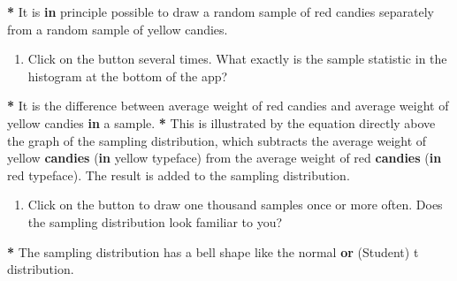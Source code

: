 \documentclass[a4paper]{book}
\newenvironment{Shaded}{\begin{snugshade}}{\end{snugshade}}
\newcommand{\KeywordTok}[1]{\textcolor[rgb]{0,0,0}{\textbf{#1}}}
\newcommand{\StringTok}[1]{\textcolor[rgb]{0.00,0.00,0.00}{#1}}
\newcommand{\ControlFlowTok}[1]{\textcolor[rgb]{0.00,0.00,0.00}{\textbf{#1}}}
\newcommand{\OperatorTok}[1]{\textcolor[rgb]{0.00,0.00,0.00}{\textbf{#1}}}
\newcommand{\NormalTok}[1]{#1}
\providecommand{\tightlist}{%
  \setlength{\itemsep}{0pt}\setlength{\parskip}{0pt}}
\theoremstyle{definition}
\theoremstyle{definition}
\theoremstyle{definition}
\theoremstyle{remark}
\begin{document}
\begin{Shaded}
\begin{Highlighting}[]
\OperatorTok{*}\StringTok{ }\NormalTok{It is }\ControlFlowTok{in}\NormalTok{ principle possible to draw a random sample of red candies}
\NormalTok{separately from a random sample of yellow candies.}
\end{Highlighting}
\end{Shaded}

\begin{enumerate}
\def\labelenumi{\arabic{enumi}.}
\setcounter{enumi}{1}
\tightlist
\item
  Click on the button several times. What exactly is the sample
  statistic in the histogram at the bottom of the app?
\end{enumerate}

\begin{Shaded}
\begin{Highlighting}[]
\OperatorTok{*}\StringTok{ }\NormalTok{It is the difference between average weight of red candies and average}
\NormalTok{weight of yellow candies }\ControlFlowTok{in}\NormalTok{ a sample.}
\OperatorTok{*}\StringTok{ }\NormalTok{This is illustrated by the equation directly above the graph of the sampling}
\NormalTok{distribution, which subtracts the average weight of yellow }\KeywordTok{candies}\NormalTok{ (}\ControlFlowTok{in}\NormalTok{ yellow}
\NormalTok{typeface) from the average weight of red }\KeywordTok{candies}\NormalTok{ (}\ControlFlowTok{in}\NormalTok{ red typeface). The result}
\NormalTok{is added to the sampling distribution.}
\end{Highlighting}
\end{Shaded}

\begin{enumerate}
\def\labelenumi{\arabic{enumi}.}
\setcounter{enumi}{2}
\tightlist
\item
  Click on the button to draw one thousand samples once or more often.
  Does the sampling distribution look familiar to you?
\end{enumerate}

\begin{Shaded}
\begin{Highlighting}[]
\OperatorTok{*}\StringTok{ }\NormalTok{The sampling distribution has a bell shape like the normal }\KeywordTok{or}\NormalTok{ (Student) t}
\NormalTok{distribution.}
\end{Highlighting}
\end{Shaded}
\end{document}
